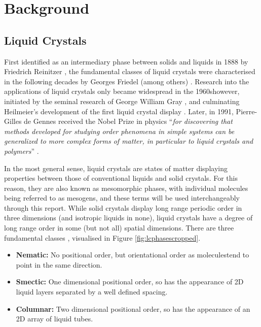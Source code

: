 \documentclass[11pt, a4paper]{article} %
\providecommand{\DIFadd}[1]{{\protect\color{blue}\uwave{#1}}} %
\providecommand{\DIFaddbegin}{} %
\providecommand{\DIFaddend}{} %
\begin{document}
\section{Background} \label{sec:Background}
\subsection{Liquid Crystals}

First identified as an intermediary phase between solids and liquids in 1888 by Friedrich Reinitzer \cite{Reinitzer1888}, the fundamental classes of liquid crystals were characterised in the following decades by Georges Friedel (among others) \cite{Friedel1922}. Research into the applications of liquid crystals only became widespread in the 1960s\DIFaddbegin \DIFadd{, }\DIFaddend however, initiated by the seminal research of George William Gray \cite{Gray1962}, and culminating Heilmeier's development of the first liquid crystal display \cite{Heilmeier1969, Heilmeier1968}. Later, in 1991, Pierre-Gilles de Gennes  received the Nobel Prize in physics ``\textit{for discovering that methods developed for studying order phenomena in simple systems can be generalized to more complex forms of matter, in particular to liquid crystals and polymers}'' \cite{DeGennes1992}.

In the most general sense, liquid crystals are states of matter displaying properties between those of conventional liquids and solid crystals. For this reason, they are also known as mesomorphic phases, with individual molecules being referred to as mesogens, and these terms will be used interchangeably through this report. While solid crystals display long range periodic order in three dimensions (and isotropic liquids in none), liquid crystals have a degree of long range order in some (but not all) spatial dimensions. There are three fundamental classes \cite{DeGennes1993}, visualised in Figure \ref{fig:lcphasescropped}.

\begin{itemize}
	\item \textbf{Nematic:} No positional order, but orientational order as molecules\DIFaddbegin \footnotemark \DIFadd{\ }\DIFaddend tend to point in the same direction.
	\item \textbf{Smectic:} One dimensional positional order, so has the appearance of 2D liquid layers separated by a well defined spacing.
	\item \textbf{Columnar:} Two dimensional positional order, so has the appearance of an 2D array of liquid tubes.
\end{itemize}
\end{document}

